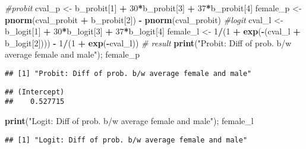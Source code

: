 \documentclass[
  12pt,
]{article}
\newenvironment{Shaded}{\begin{snugshade}}{\end{snugshade}}
\newcommand{\CommentTok}[1]{\textcolor[rgb]{0.56,0.35,0.01}{\textit{#1}}}
\newcommand{\DecValTok}[1]{\textcolor[rgb]{0.00,0.00,0.81}{#1}}
\newcommand{\KeywordTok}[1]{\textcolor[rgb]{0.13,0.29,0.53}{\textbf{#1}}}
\newcommand{\NormalTok}[1]{#1}
\newcommand{\OperatorTok}[1]{\textcolor[rgb]{0.81,0.36,0.00}{\textbf{#1}}}
\newcommand{\StringTok}[1]{\textcolor[rgb]{0.31,0.60,0.02}{#1}}
\begin{document}
\begin{Shaded}
\begin{Highlighting}[]
\CommentTok{\#probit}
\NormalTok{cval\_p \textless{}{-}}\StringTok{ }\NormalTok{b\_probit[}\DecValTok{1}\NormalTok{] }\OperatorTok{+}\StringTok{ }\DecValTok{30}\OperatorTok{*}\NormalTok{b\_probit[}\DecValTok{3}\NormalTok{] }\OperatorTok{+}\StringTok{ }\DecValTok{37}\OperatorTok{*}\NormalTok{b\_probit[}\DecValTok{4}\NormalTok{] }
\NormalTok{female\_p \textless{}{-}}\StringTok{ }\KeywordTok{pnorm}\NormalTok{(cval\_probit }\OperatorTok{+}\StringTok{ }\NormalTok{b\_probit[}\DecValTok{2}\NormalTok{]) }\OperatorTok{{-}}\StringTok{ }\KeywordTok{pnorm}\NormalTok{(cval\_probit)}
\CommentTok{\#logit}
\NormalTok{cval\_l \textless{}{-}}\StringTok{ }\NormalTok{b\_logit[}\DecValTok{1}\NormalTok{] }\OperatorTok{+}\StringTok{ }\DecValTok{30}\OperatorTok{*}\NormalTok{b\_logit[}\DecValTok{3}\NormalTok{] }\OperatorTok{+}\StringTok{ }\DecValTok{37}\OperatorTok{*}\NormalTok{b\_logit[}\DecValTok{4}\NormalTok{]}
\NormalTok{female\_l \textless{}{-}}\StringTok{ }\DecValTok{1}\OperatorTok{/}\NormalTok{(}\DecValTok{1} \OperatorTok{+}\StringTok{ }\KeywordTok{exp}\NormalTok{(}\OperatorTok{{-}}\NormalTok{(cval\_l }\OperatorTok{+}\StringTok{ }\NormalTok{b\_logit[}\DecValTok{2}\NormalTok{]))) }\OperatorTok{{-}}\StringTok{ }\DecValTok{1}\OperatorTok{/}\NormalTok{(}\DecValTok{1} \OperatorTok{+}\StringTok{ }\KeywordTok{exp}\NormalTok{(}\OperatorTok{{-}}\NormalTok{cval\_l)) }
\CommentTok{\# result}
\KeywordTok{print}\NormalTok{(}\StringTok{"Probit: Diff of prob. b/w average female and male"}\NormalTok{); female\_p}
\end{Highlighting}
\end{Shaded}

\begin{verbatim}
## [1] "Probit: Diff of prob. b/w average female and male"
\end{verbatim}

\begin{verbatim}
## (Intercept) 
##    0.527715
\end{verbatim}

\begin{Shaded}
\begin{Highlighting}[]
\KeywordTok{print}\NormalTok{(}\StringTok{"Logit: Diff of prob. b/w average female and male"}\NormalTok{); female\_l}
\end{Highlighting}
\end{Shaded}

\begin{verbatim}
## [1] "Logit: Diff of prob. b/w average female and male"
\end{verbatim}
\end{document}
